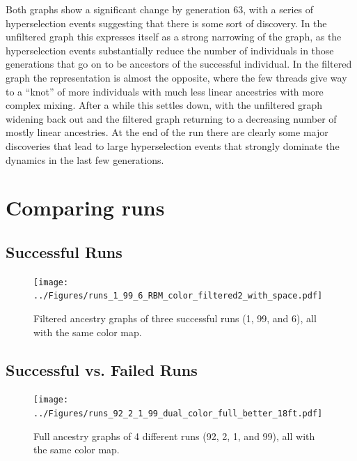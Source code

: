 \documentclass{sig-alternate}
\begin{document}
Both graphs show a significant change by generation 63, with a series of
hyperselection events suggesting that there is some sort of discovery. In the
unfiltered graph this expresses itself as a strong narrowing of the graph, as
the hyperselection events substantially reduce the number of individuals in
those generations that go on to be ancestors of the successful individual. In
the filtered graph the representation is almost the opposite, where the few
threads give way to a ``knot'' of more individuals with much less linear 
ancestries with more complex mixing. After a while this settles down, with the
unfiltered graph widening back out and the filtered graph returning to a
decreasing number of mostly linear ancestries. At the end of the run there are
clearly some major discoveries that lead to large hyperselection events that
strongly dominate the dynamics in the last few generations.

\section{Comparing runs}
\label{sec:comparisons}

\subsection{Successful Runs}
\begin{figure}[tb]
	\begin{center}
		\texttt{[image: ../Figures/runs\_1\_99\_6\_RBM\_color\_filtered2\_with\_space.pdf]}
	\end{center}
	\caption{Filtered ancestry graphs of three successful runs (1, 99, and 6), all with the same color map.}
	\label{fig:runs1:99:6:filtered}
\end{figure}


\subsection{Successful vs. Failed Runs}
\begin{figure}[tb]
	\begin{center}
		\texttt{[image: ../Figures/runs\_92\_2\_1\_99\_dual\_color\_full\_better\_18ft.pdf]}
	\end{center}
	\caption{Full ancestry graphs of 4 different runs (92, 2, 1, and 99), all with the same color map.}
	\label{fig:runs92:2:1:99:filtered}
\end{figure}
\end{document}
